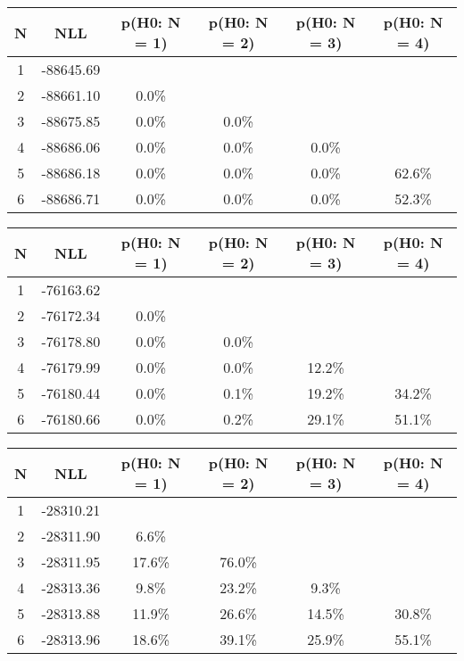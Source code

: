 \begin{table}[htb]
	\begin{center}
{\footnotesize\renewcommand{\arraystretch}{1.4}
		\begin{tabular}{cc||cccc}
			N & NLL & p(H0: N = 1) & p(H0: N = 2) & p(H0: N = 3) & p(H0: N = 4)\\ 
		\hline
1 & -88645.69 & & & & \\
2 & -88661.10 & 0.0\% & & & \\
3 & -88675.85 & 0.0\% & 0.0\% & & \\
4 & -88686.06 & 0.0\% & 0.0\% & 0.0\% & \\
5 & -88686.18 & 0.0\% & 0.0\% & 0.0\% & 62.6\% \\
6 & -88686.71 & 0.0\% & 0.0\% & 0.0\% & 52.3\% \\
	\end{tabular}
		\label{tab:lab}
	}
	\end{center}\end{table}

\begin{table}[htb]
	\begin{center}
{\footnotesize\renewcommand{\arraystretch}{1.4}
		\begin{tabular}{cc||cccc}
			N & NLL & p(H0: N = 1) & p(H0: N = 2) & p(H0: N = 3) & p(H0: N = 4)\\ 
		\hline
1 & -76163.62 & & & & \\
2 & -76172.34 & 0.0\% & & & \\
3 & -76178.80 & 0.0\% & 0.0\% & & \\
4 & -76179.99 & 0.0\% & 0.0\% & 12.2\% & \\
5 & -76180.44 & 0.0\% & 0.1\% & 19.2\% & 34.2\% \\
6 & -76180.66 & 0.0\% & 0.2\% & 29.1\% & 51.1\% \\
	\end{tabular}
		\label{tab:lab}
	}
	\end{center}\end{table}

\begin{table}[htb]
	\begin{center}
{\footnotesize\renewcommand{\arraystretch}{1.4}
		\begin{tabular}{cc||cccc}
			N & NLL & p(H0: N = 1) & p(H0: N = 2) & p(H0: N = 3) & p(H0: N = 4)\\ 
		\hline
1 & -28310.21 & & & & \\
2 & -28311.90 & 6.6\% & & & \\
3 & -28311.95 & 17.6\% & 76.0\% & & \\
4 & -28313.36 & 9.8\% & 23.2\% & 9.3\% & \\
5 & -28313.88 & 11.9\% & 26.6\% & 14.5\% & 30.8\% \\
6 & -28313.96 & 18.6\% & 39.1\% & 25.9\% & 55.1\% \\
	\end{tabular}
		\label{tab:lab}
	}
	\end{center}\end{table}

